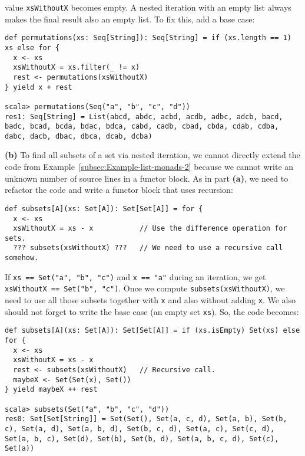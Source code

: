 value \lstinline!xsWithoutX! becomes empty. A nested iteration with
an empty list always makes the final result also an empty list. To
fix this, add a base case:
\begin{lstlisting}
def permutations(xs: Seq[String]): Seq[String] = if (xs.length == 1) xs else for {
  x <- xs
  xsWithoutX = xs.filter(_ != x)
  rest <- permutations(xsWithoutX)
} yield x + rest

scala> permutations(Seq("a", "b", "c", "d"))
res1: Seq[String] = List(abcd, abdc, acbd, acdb, adbc, adcb, bacd, badc, bcad, bcda, bdac, bdca, cabd, cadb, cbad, cbda, cdab, cdba, dabc, dacb, dbac, dbca, dcab, dcba) 
\end{lstlisting}

\textbf{(b)} To find all subsets of a set via nested iteration, we
cannot directly extend the code from Example~\ref{subsec:Example-list-monads-2}
because we cannot write an unknown number of source lines in a functor
block. As in part \textbf{(a)}, we need to refactor the code and write
a functor block that uses recursion:
\begin{lstlisting}
def subsets[A](xs: Set[A]): Set[Set[A]] = for {
  x <- xs
  xsWithoutX = xs - x           // Use the difference operation for sets.
  ??? subsets(xsWithoutX) ???   // We need to use a recursive call somehow.
\end{lstlisting}
If \lstinline!xs == Set("a", "b", "c")! and \lstinline!x == "a"!
during an iteration, we get \lstinline!xsWithoutX == Set("b", "c")!.
Once we compute \lstinline!subsets(xsWithoutX)!, we need to use all
those subsets together with \lstinline!x! and also without adding
\lstinline!x!. We also should not forget to write the base case (an
empty set \lstinline!xs!). So, the code becomes:
\begin{lstlisting}
def subsets[A](xs: Set[A]): Set[Set[A]] = if (xs.isEmpty) Set(xs) else for {
  x <- xs
  xsWithoutX = xs - x
  rest <- subsets(xsWithoutX)   // Recursive call.
  maybeX <- Set(Set(x), Set())
} yield maybeX ++ rest

scala> subsets(Set("a", "b", "c", "d"))
res0: Set[Set[String]] = Set(Set(), Set(a, c, d), Set(a, b), Set(b, c), Set(a, d), Set(a, b, d), Set(b, c, d), Set(a, c), Set(c, d), Set(a, b, c), Set(d), Set(b), Set(b, d), Set(a, b, c, d), Set(c), Set(a)) 
\end{lstlisting}

